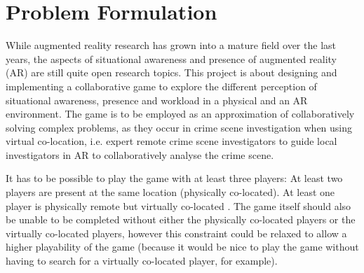 \chapter{Problem Formulation} \label{cha:problem}
	While augmented reality research has grown into a mature field over the 
	last years, the aspects of situational awareness and presence of 
	augmented reality (AR) are still quite open research topics. This 
	project is about designing and implementing a collaborative game to 
	explore the different perception of situational awareness, presence and 
	workload in a physical and an AR environment. The game is to be employed 
	as an approximation of collaboratively solving complex problems, as they 
	occur in crime scene investigation when using virtual co-location, i.e. 
	expert remote crime scene investigators to guide local investigators in 
	AR to collaboratively analyse the crime scene. 
	
	It has to be possible to play the game with at least three players: At 
	least two players are present at the same location (physically 
	co-located). At least one player is physically remote but virtually 
	co-located \cite{bepsys}. The game itself should also be unable to be
	completed without either the physically co-located players or the 
	virtually co-located players, however this constraint could be relaxed
	to allow a higher playability of the game (because it would be nice to
	play the game without having to search for a virtually co-located player,
	for example).
	
